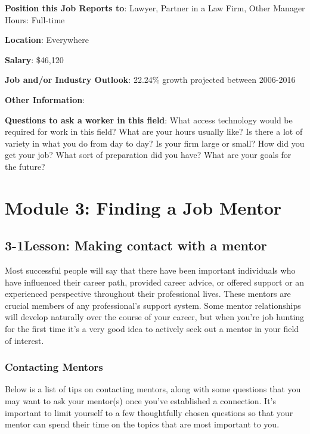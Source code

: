 \textbf{Position this Job Reports to}: Lawyer, Partner in a Law Firm, Other Manager Hours: Full-time

\textbf{Location}: Everywhere 

\textbf{Salary}: \$46,120

\textbf{Job and/or Industry Outlook}: 22.24\% growth projected between 2006-2016 

\textbf{Other Information}:

\textbf{Questions to ask a worker in this field}:
\break What access technology would be required for work in this field? 
\break What are your hours usually like?
\break Is there a lot of variety in what you do from day to day?
\break Is your firm large or small?
\break How did you get your job?
\break What sort of preparation did you have? 
\break What are your goals for the future?
  
\pagebreak \section*{Module 3:  Finding a Job Mentor}
\noindent\makebox[\textwidth]{\rule{\linewidth}{0.4pt}}  \localtableofcontents 
\noindent\makebox[\textwidth]{\rule{\linewidth}{0.4pt}} 

\pagebreak \subsection*{3-1\quad  Lesson: Making contact with a mentor}
Most successful people will say that there have been important individuals who have influenced their career path, provided career advice, or offered support or an experienced perspective throughout their professional lives. These mentors are crucial members of any professional's support system. Some mentor relationships will develop naturally over the course of your career, but when you're job hunting for the first time it's a very good idea to actively seek out a mentor in your field of interest.
\subsubsection*{Contacting Mentors}
Below is a list of tips on contacting mentors, along with some questions that you may want to ask your mentor(s) once you've established a connection. It's important to limit yourself to a few thoughtfully chosen questions so that your mentor can spend their time on the topics that are most important to you.

